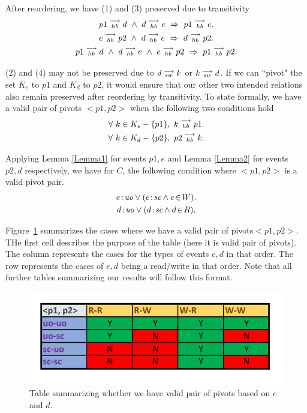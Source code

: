    After reordering, we have (1) and (3) preserved due to transitivity  
    \begin{gather*}
        \reln{p1}{hb}{d} \ \wedge \ \reln{d}{hb}{e} \ \Rightarrow \ \reln{p1}{hb}{e}. \\
        \reln{e}{hb}{p2} \ \wedge \ \reln{d}{hb}{e} \ \Rightarrow \ \reln{d}{hb}{p2}. \\
        \reln{p1}{hb}{d} \ \wedge \ \reln{d}{hb}{e} \ \wedge \ \reln{e}{hb}{p2} \ \Rightarrow \ \reln{p1}{hb}{p2}. 
    \end{gather*}

    (2) and (4) may not be preserved due to $d\stackrel{\longrightarrow}{_{sw}}k$ or $k\stackrel{\longrightarrow}{_{sw}}d$. If we can ``pivot" the  set $K_e$ to $p1$ and $K_d$ to $p2$, it would ensure that our other two intended relations also remain preserved after reordering by transitivity. To state formally, we have a valid pair of pivots $<p1,p2>$ when the following two conditions hold
    \begin{gather*}
        \forall \ k \in K_e - \{p1\}, \ k\stackrel{\longrightarrow}{_{hb}}p1. \\
        \forall \ k \in K_d - \{p2\}, \ p2\stackrel{\longrightarrow}{_{hb}}k.
    \end{gather*}
    
    Applying Lemma \ref{Lemma1} for events $p1,e$ and Lemma \ref{Lemma2} for events $p2,d$ respectively, we have for $C$, the following condition where $<p1, p2>$ is a valid pivot pair.
    \begin{gather*}
        \et{e}{uo} \vee (\et{e}{sc} \wedge \event{e}{W}). \\
        \et{d}{uo} \vee (\et{d}{sc} \wedge \event{d}{R}).
    \end{gather*}
        
    Figure~\ref{reord:preserve_hb_table} summarizes the cases where we have a valid pair of pivots\footnotemark $<p1,p2>$.
    THe first cell describes the purpose of the table (here it is valid pair of pivots).
    The column represents the cases for the types of events $e,d$ in that order. 
    The row represents the cases of $e,d$ being a read/write in that order. 
    Note that all further tables summarizing our results will follow this format. 
    \begin{figure}[H]
        \centering
        \includegraphics[scale=0.7]{4.InstructionReordering/4.ValidReorderingCandidate/ProofParts/Part1/part1_table.pdf}
        \caption{Table summarizing whether we have valid pair of pivots based on  $e$ and $d$.}
        \label{reord:preserve_hb_table}
    \end{figure}
            
